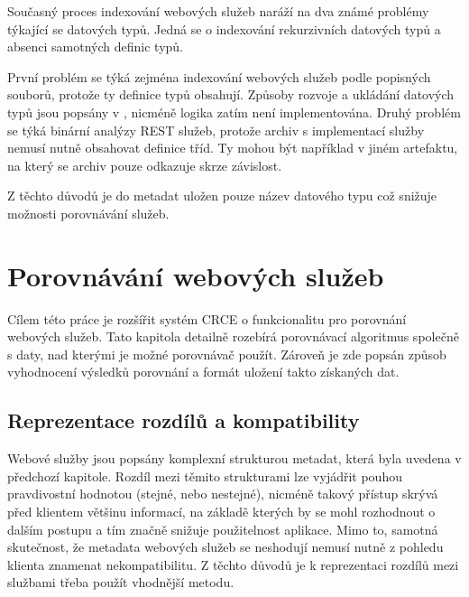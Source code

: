 \documentclass[czech,DP]{thesiskiv}
\begin{document}
Současný proces indexování webových služeb naráží na dva známé problémy týkající se datových typů. Jedná se o indexování rekurzivních datových typů a absenci samotných definic typů.

První problém se týká zejména indexování webových služeb podle popisných souborů, protože ty definice typů obsahují. Způsoby rozvoje a ukládání datových typů jsou popsány v \cite{abadi1995subytping}, nicméně logika zatím není implementována. Druhý problém se týká binární analýzy REST služeb, protože archiv s implementací služby nemusí nutně obsahovat definice tříd. Ty mohou být například v jiném artefaktu, na který se archiv pouze odkazuje skrze závislost.

Z těchto důvodů je do metadat uložen pouze název datového typu což snižuje možnosti porovnávání služeb.


\chapter{Porovnávání webových služeb}

Cílem této práce je rozšířit systém CRCE o funkcionalitu pro porovnání webových služeb. Tato kapitola detailně rozebírá porovnávací algoritmus společně s daty, nad kterými je možné porovnávač použít. Zároveň je zde popsán způsob vyhodnocení výsledků porovnání a formát uložení takto získaných dat.

\section{Reprezentace rozdílů a kompatibility}
\label{sec:diff-info}
Webové služby jsou popsány komplexní strukturou metadat, která byla uvedena v předchozí kapitole. Rozdíl mezi těmito strukturami lze vyjádřit pouhou pravdivostní hodnotou (stejné, nebo nestejné), nicméně takový přístup skrývá před klientem většinu informací, na základě kterých by se mohl rozhodnout o dalším postupu a tím značně snižuje použitelnost aplikace. Mimo to, samotná skutečnost, že metadata webových služeb se neshodují nemusí nutně z pohledu klienta znamenat nekompatibilitu. Z těchto důvodů je k reprezentaci rozdílů mezi službami třeba použít vhodnější metodu.
\end{document}
